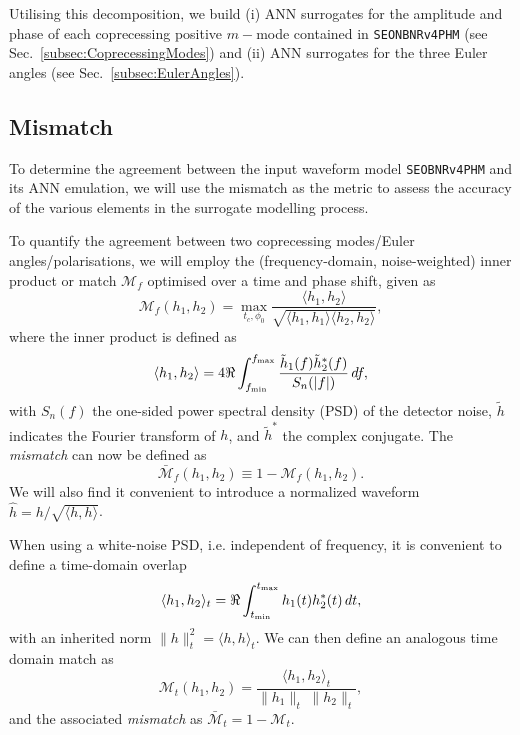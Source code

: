 \documentclass[prd,amssymb,amsmath,amsfonts,superscriptaddress,nofootinbib,reprint,showpacs, longbibliography]{revtex4-1}
\newcommand{\SEOB}{\texttt{SEOBNRv4PHM}}
\begin{document}
Utilising this decomposition, we build (i) ANN surrogates for the amplitude and phase of each coprecessing positive $m-$mode contained in \texttt{SEONBNRv4PHM} (see Sec.~\ref{subsec:CoprecessingModes}) and (ii) ANN surrogates for the three Euler angles (see Sec.~\ref{subsec:EulerAngles}). 


\subsection{Mismatch}
\label{subsec:Mismatch}
To determine the agreement between the input waveform model \SEOB{} and its ANN emulation, we will use the mismatch as the metric to assess the accuracy of the various elements in the surrogate modelling process.

To quantify the agreement between two coprecessing modes/Euler angles/polarisations, we will employ the (frequency-domain, noise-weighted) inner product or match $\mathcal{M}_{f}$ optimised over a time and phase shift, given as
\begin{equation}
    \label{eq:Match}
    \mathcal{M}_{f}(h_1,h_2) = \max_{t_{c}, \phi_{0}}\frac{\langle h_1, h_2\rangle}{\sqrt{\langle h_1, h_1\rangle \langle h_2, h_2\rangle}},
\end{equation}
where the inner product is defined as
\begin{equation}
    \label{eq:InnerProduct}
    \langle h_1,h_2 \rangle = 4\Re \displaystyle\int^{f_{\rm{max}}}_{f_{\rm{min}}} \frac{\tilde{h}_1(f)\tilde{h}_{2}^*(f)}{S_n (|f|)} \, df,
\end{equation}
with $S_n(f)$ the one-sided power spectral density (PSD) of the detector noise, $\tilde{h}$ indicates the Fourier transform of $h$, and $\tilde{h}^*$ the complex conjugate. The \textit{mismatch} can now be defined as
\begin{equation}
    \bar{\mathcal{M}}_{f} (h_1, h_2) \equiv 1 - \mathcal{M}_{f} (h_1, h_2). 
\end{equation}
\newline 
We will also find it convenient to introduce a normalized waveform $\hat{h} = h / \sqrt{\langle h , h \rangle}$. 

When using a white-noise PSD, i.e. independent of frequency, it is convenient to define a time-domain overlap
\begin{equation}
    \label{eq:InnerProductTD}
    \langle h_1 , h_2 \rangle_t = \Re \displaystyle\int^{t_{\rm max}}_{t_{\rm min}} h_1 (t) h^{\ast}_2 (t) \, dt ,
\end{equation}
\newline 
with an inherited norm $\| h \|^2_t = \langle h, h \rangle_t$. We can then define an analogous time domain match as 
\begin{equation}
    \label{eq:MismatchTD}
    \mathcal{M}_t (h_1,h_2) = \frac{\langle h_1, h_2 \rangle_t}{\| h_1 \|_t \; \| h_2 \|_t},
\end{equation}
\newline 
and the associated \textit{mismatch} as $\bar{\mathcal{M}}_t = 1 - \mathcal{M}_t$. 
\end{document}
